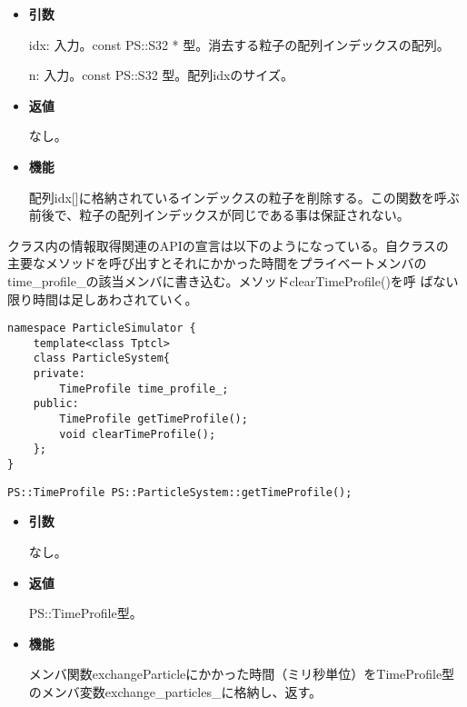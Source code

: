 \begin{itemize}

\item {\bf 引数}

idx: 入力。const PS::S32 * 型。消去する粒子の配列インデックスの配列。

n: 入力。const PS::S32 型。配列idxのサイズ。

\item {\bf 返値}

なし。

\item {\bf 機能}

配列idx[]に格納されているインデックスの粒子を削除する。この関数を呼ぶ
前後で、粒子の配列インデックスが同じである事は保証されない。


\end{itemize}



クラス内の情報取得関連のAPIの宣言は以下のようになっている。自クラスの
主要なメソッドを呼び出すとそれにかかった時間をプライベートメンバの
time\_profile\_の該当メンバに書き込む。メソッドclearTimeProfile()を呼
ばない限り時間は足しあわされていく。

\begin{lstlisting}[caption=ParticleSystem3]
namespace ParticleSimulator {
    template<class Tptcl>
    class ParticleSystem{
    private:
        TimeProfile time_profile_;
    public:
        TimeProfile getTimeProfile();
        void clearTimeProfile();
    };
}
\end{lstlisting}

\begin{screen}
\begin{verbatim}
PS::TimeProfile PS::ParticleSystem::getTimeProfile();
\end{verbatim}
\end{screen}

\begin{itemize}

\item {\bf 引数}

なし。

\item {\bf 返値}

PS::TimeProfile型。

\item {\bf 機能}

メンバ関数exchangeParticleにかかった時間（ミリ秒単位）をTimeProfile型
のメンバ変数exchange\_particles\_に格納し、返す。

\end{itemize}

